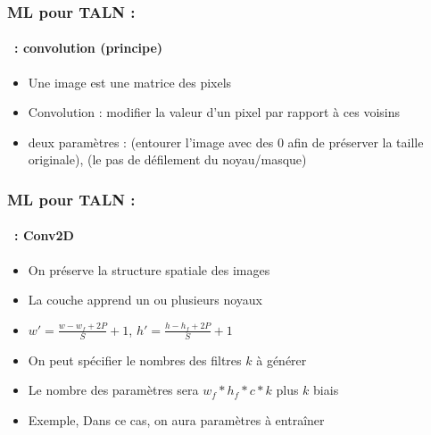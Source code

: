 \documentclass[xcolor=table]{beamer}
\begin{document}
	\begin{frame}
		\frametitle{ML pour TALN : \insertsection}
		\framesubtitle{\insertsubsection\ : convolution (principe)}
		
		\begin{itemize}
			\item Une image est une matrice des pixels
			\item Convolution : modifier la valeur d'un pixel par rapport à ces voisins
			\item deux paramètres :  (entourer l'image avec des 0 afin de préserver la taille originale),  (le pas de défilement du noyau/masque)
		\end{itemize}
		
		\begin{center}
		\end{center}
		
	\end{frame}
	
	\begin{frame}
		\frametitle{ML pour TALN : \insertsection}
		\framesubtitle{\insertsubsection\ : Conv2D}
		
		\begin{minipage}{0.60\textwidth} 
			\begin{itemize}
				\item On préserve la structure spatiale des images
				\item La couche apprend un ou plusieurs noyaux
				\item $ w' = \frac{w - w_f + 2P}{S} + 1$,  $ h' = \frac{h - h_f + 2P}{S} + 1$
				\item On peut spécifier le nombres des filtres $k$ à générer 
				\item Le nombre des paramètres sera $w_f * h_f * c * k$ plus $k$ biais
				\item Exemple,  Dans ce cas, on aura  paramètres à entraîner
			\end{itemize}
		\end{minipage}
		\begin{minipage}{0.39\textwidth}
			\hgraphpage[\textwidth]{conv2d.pdf}
		\end{minipage}
		
	\end{frame}
	
\end{document}
